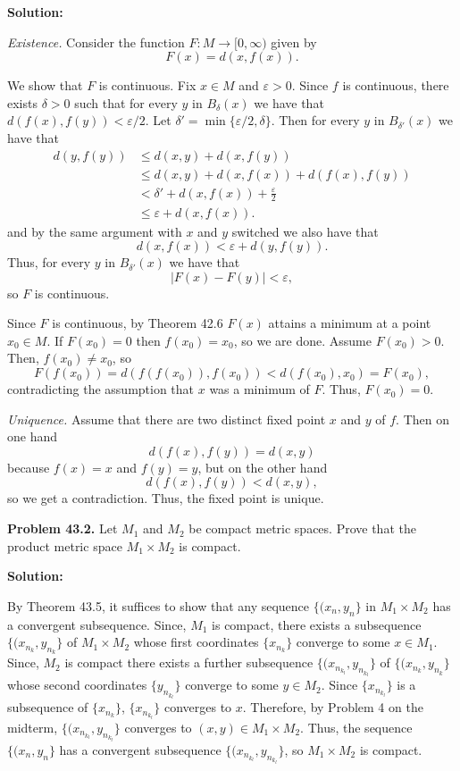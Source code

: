 \documentclass[12pt]{article}
\def\black{\color{black}}
\def\green{\color{rltgreen}}
\renewcommand\|{\ | \ }
\newcommand\ra{\rightarrow}
\def\pb#1{{\green \bf Problem #1.}\hskip 8pt \black}
\def\sol{\textbf{Solution:}}
\def\subsequence#1{$\{{#1}_{n_k}\}$}
\newcommand\e\varepsilon
\begin{document}
\sol

\emph{Existence.}
Consider the function $F: M \ra [0, \infty)$ given by 
\[
F(x) = d(x, f(x)).
\]

We show that $F$ is continuous. Fix $x \in M$ and $\e > 0$. Since
$f$ is continuous, there exists $\delta > 0$ such that for every
$y$ in $B_{\delta}(x)$ we have that $d(f(x), f(y)) < \e/2$.
Let $\delta' = \min\{\e/2, \delta\}$. Then for every
$y$ in $B_{\delta'}(x)$ we have that
\begin{align*}
d(y, f(y)) 
& \leq d(x, y) + d(x, f(y)) \\
& \leq d(x, y) + d(x, f(x)) + d(f(x), f(y)) \\
& < \delta' + d(x, f(x)) + \frac \e 2 \\
& \leq \e + d(x, f(x)).
\end{align*}
and by the same argument with $x$ and $y$ switched we also have that
\[
d(x, f(x))  < \e + d(y, f(y)).
\]
Thus, for every $y$ in $B_{\delta'}(x)$ we have that
\[
|F(x) - F(y)| < \e,
\]
so $F$ is continuous.

Since $F$ is continuous,
by Theorem 42.6 $F(x)$ attains a minimum at a point $x_0 \in M$. If 
$F(x_0) = 0$ then $f(x_0) = x_0$, so we are done. Assume $F(x_0) > 0$. 
Then, $f(x_0) \neq x_0$, so
\[
F(f(x_0)) = d(f(f(x_0)), f(x_0)) < d(f(x_0), x_0) = F(x_0),
\]
contradicting the assumption that $x$ was a minimum of $F$. Thus,
$F(x_0) = 0$.

\emph{Uniquence.}
Assume that there are two distinct fixed point $x$ and $y$ of $f$. Then 
on one hand
\[
d(f(x), f(y)) = d(x, y)
\]
because $f(x) = x$ and $f(y) = y$, but on the other hand
\[
d(f(x), f(y)) < d(x, y),
\]
so we get a contradiction. Thus, the fixed point is unique.


\pb{43.2}
Let $M_1$ and $M_2$ be compact metric spaces. Prove that the product metric
space $M_1 \times M_2$ is compact.

\sol

By Theorem 43.5, it suffices to show that any sequence 
$\{(x_n, y_n\}$ in $M_1 \times M_2$ has a convergent subsequence. 
Since, $M_1$ is compact, there exists a subsequence 
$\{(x_{n_k}, y_{n_k}\}$ of $M_1 \times M_2$ whose first coordinates 
\subsequence x converge to some $x \in M_1$. Since, $M_2$ is compact there
exists a further subsequence $\{(x_{n_{k_l}}, y_{n_{k_l}}\}$ of 
$\{(x_{n_k}, y_{n_k}\}$ whose second coordinates
$\{ y_{n_{k_l}}\}$ converge to some $y \in M_2$. Since  $\{x_{n_{k_l}}\}$
is a subsequence of \subsequence x,
$\{x_{n_{k_l}}\}$ converges to $x$. Therefore, by Problem 4 on the 
midterm,
$\{(x_{n_{k_l}}, y_{n_{k_l}}\}$ converges to $(x, y) \in M_1 \times M_2$.
Thus, the sequence $\{(x_n, y_n\}$ has a convergent subsequence 
$\{(x_{n_{k_l}}, y_{n_{k_l}}\}$, so $M_1 \times M_2$ is compact.
\end{document}
